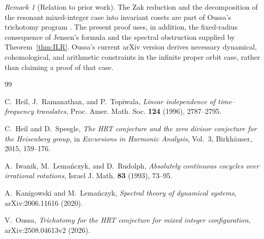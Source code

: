 \documentclass[11pt]{amsart}
\theoremstyle{remark}
\newtheorem{remark}[theorem]{Remark}
\begin{document}
\begin{remark}[Relation to prior work]
The Zak reduction and the decomposition of the resonant mixed-integer case into
invariant cosets are part of Oussa's trichotomy program \cite{Oussa}. The present proof
uses, in addition, the fixed-radius consequence of Jensen's formula and the spectral
obstruction supplied by Theorem~\ref{thm:ILR}. Oussa's current arXiv version derives
necessary dynamical, cohomological, and arithmetic constraints in the infinite proper
orbit case, rather than claiming a proof of that case.
\end{remark}

\begin{thebibliography}{99}

C.~Heil, J.~Ramanathan, and P.~Topiwala,
\emph{Linear independence of time--frequency translates},
Proc. Amer. Math. Soc. \textbf{124} (1996), 2787--2795.

C.~Heil and D.~Speegle,
\emph{The HRT conjecture and the zero divisor conjecture for the Heisenberg group},
in \emph{Excursions in Harmonic Analysis}, Vol.~3,
Birkh\"auser, 2015, 159--176.

A.~Iwanik, M.~Lema\'nczyk, and D.~Rudolph,
\emph{Absolutely continuous cocycles over irrational rotations},
Israel J. Math. \textbf{83} (1993), 73--95.

A.~Kanigowski and M.~Lema\'nczyk,
\emph{Spectral theory of dynamical systems},
arXiv:2006.11616 (2020).

V.~Oussa,
\emph{Trichotomy for the HRT conjecture for mixed integer configuration},
arXiv:2508.04613v2 (2026).

\end{thebibliography}
\end{document}
